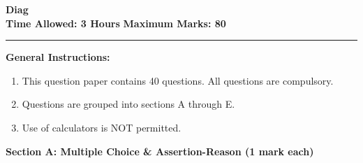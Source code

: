 \documentclass[12pt,a4paper]{exam}
\begin{document}
\thispagestyle{empty}
\begin{center}
  \textbf{\LARGE Diag} \\[0.3cm]
  \textbf{Time Allowed: 3 Hours} \hfill \textbf{Maximum Marks: 80} \\[0.3cm]
  \rule{\textwidth}{0.5pt}
\end{center}

\vspace{0.3cm}

\noindent\textbf{General Instructions:}
\begin{enumerate}
  \item {\normalfont\normalcolor This question paper contains 40 questions. All questions are compulsory.}
  \item {\normalfont\normalcolor Questions are grouped into sections A through E.}
  \item {\normalfont\normalcolor Use of calculators is NOT permitted.}
\end{enumerate}
\bigskip
\noindent\textbf{\large Section A: Multiple Choice \& Assertion-Reason (1 mark each)}
\end{document}
